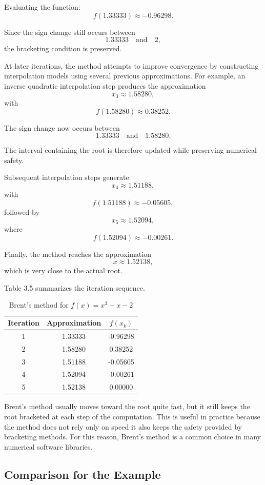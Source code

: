 Evaluating the function:
\[
f(1.33333)
\approx
-0.96298.
\]

Since the sign change still occurs between
\[
1.33333
\quad \text{and} \quad
2,
\]
the bracketing condition is preserved.

At later iterations, the method attempts to improve convergence by constructing interpolation models using several previous approximations. For example, an inverse quadratic interpolation step produces the approximation
\[
x_3
\approx
1.58280,
\]
with
\[
f(1.58280)
\approx
0.38252.
\]

The sign change now occurs between
\[
1.33333
\quad \text{and} \quad
1.58280.
\]

The interval containing the root is therefore updated while preserving numerical safety.

Subsequent interpolation steps generate
\[
x_4
\approx
1.51188,
\]
with
\[
f(1.51188)
\approx
-0.05605,
\]
followed by
\[
x_5
\approx
1.52094,
\]
where
\[
f(1.52094)
\approx
-0.00261.
\]

Finally, the method reaches the approximation
\[
x
\approx
1.52138,
\]
which is very close to the actual root.

Table 3.5 summarizes the iteration sequence.

\begin{table}[h!]
\centering
\caption{Brent's method for \(f(x)=x^3-x-2\)}
\label{tab:brent_example}
\begin{tabular}{|c|c|c|}
\hline
Iteration & Approximation & \(f(x_k)\) \\ \hline
1 & 1.33333 & -0.96298 \\ \hline
2 & 1.58280 & 0.38252 \\ \hline
3 & 1.51188 & -0.05605 \\ \hline
4 & 1.52094 & -0.00261 \\ \hline
5 & 1.52138 & 0.00000 \\ \hline
\end{tabular}
\end{table}

Brent’s method usually moves toward the root quite fast, but it still keeps the root bracketed at each step of the computation. This is useful in practice because the method does not rely only on speed it also keeps the safety provided by bracketing methods. For this reason, Brent’s method is a common choice in many numerical software libraries.

\subsection{Comparison for the Example}

